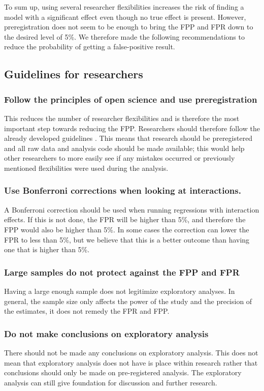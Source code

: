 To sum up, using several researcher flexibilities increases the risk of finding a model with a significant effect even though no true effect is present. However, preregistration does not seem to be enough to bring the FPP and FPR down to the desired level of 5\%. We therefore made the following recommendations to reduce the probability of getting a false-positive result. 

\subsection{Guidelines for researchers}

\subsubsection{Follow the principles of open science and use preregistration}
This reduces the number of researcher flexibilities and is therefore the most important step towards reducing the FPP. Researchers should therefore follow the already developed guidelines \citep{Nosek2015}. This means that research should be preregistered and all raw data and analysis code should be made available; this would help other researchers to more easily see if any mistakes occurred or previously mentioned flexibilities were used during the analysis. 
\subsubsection{Use Bonferroni corrections when looking at interactions.}
A Bonferroni correction should be used when running regressions with interaction effects. If this is not done, the FPR will be higher than 5\%, and therefore the FPP would also be higher than 5\%. In some cases the correction can lower the FPR to less than 5\%, but we believe that this is a better outcome than having one that is higher than 5\%. 
\subsubsection{Large samples do not protect against the FPP and FPR}
Having a large enough sample does not legitimize exploratory analyses. In general, the sample size only affects the power of the study and the precision of the estimates, it does not remedy the FPR and FPP. 
\subsubsection{Do not make conclusions on exploratory analysis}
There should not be made any conclusions on exploratory analysis. This does not mean that exploratory analysis does not have is place within research rather that conclusions should only be made on pre-registered analysis. The exploratory analysis can still give foundation for discussion and further research. 

